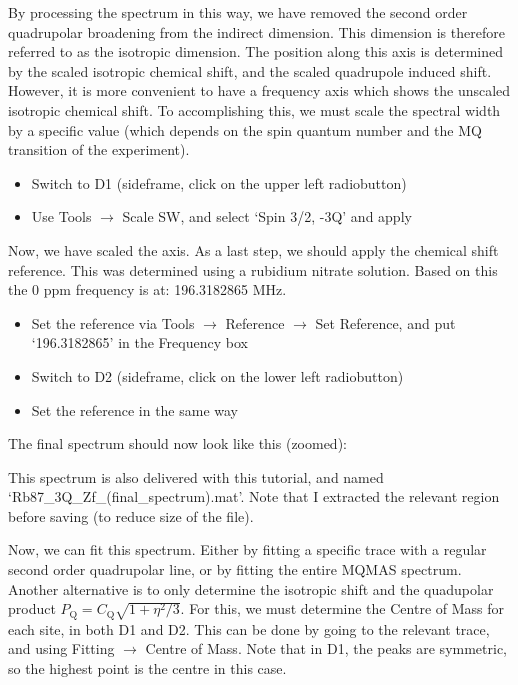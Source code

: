 \documentclass[11pt,a4paper]{article}
\begin{document}
By processing the spectrum in this way, we have removed the second order quadrupolar broadening from the indirect dimension.
This dimension is therefore referred to as the isotropic dimension.
The position along this axis is determined by the scaled isotropic chemical shift, and the scaled quadrupole induced shift.
However, it is more convenient to have a frequency axis which shows the unscaled isotropic chemical shift.
To accomplishing this, we must scale the spectral width by a specific value (which depends on the spin quantum number and the MQ transition of the experiment).
\begin{itemize}
	\item Switch to D1 (sideframe, click on the upper left radiobutton)
	\item Use Tools  $\longrightarrow$ Scale SW, and select `Spin 3/2, -3Q' and apply
\end{itemize}
Now, we have scaled the axis.
As a last step, we should apply the chemical shift reference.
This was determined using a rubidium nitrate solution.
Based on this the 0 ppm frequency is at: 196.3182865 MHz.
\begin{itemize}
  \item Set the reference via Tools $\longrightarrow$ Reference $\longrightarrow$ Set Reference, and
	 put `196.3182865' in the Frequency box
	\item Switch to D2 (sideframe, click on the lower left radiobutton)
	\item Set the reference in the same way
\end{itemize}
The final spectrum should now look like this (zoomed):
\begin{center}
\end{center}
This spectrum is also delivered with this tutorial, and named `Rb87\_3Q\_Zf\_(final\_spectrum).mat'.
Note that I extracted the relevant region before saving (to reduce size of the file).
 
Now, we can fit this spectrum.
Either by fitting a specific trace with a regular second order quadrupolar line, or by fitting the entire MQMAS spectrum.
Another alternative is to only determine the isotropic shift and the quadupolar product $P_\text{Q} = C_\text{Q}\sqrt{1+\eta^2/3}$.
For this, we must determine the Centre of Mass for each site, in both D1 and D2.
This can be done by going to the relevant trace, and using Fitting  $\longrightarrow$ Centre of Mass.
Note that in D1, the peaks are symmetric, so the highest point is the centre in this case.
\end{document}
